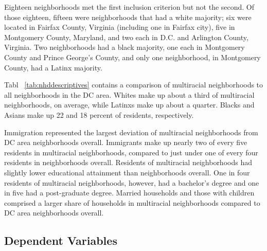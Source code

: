 \documentclass{baderart}
\begin{document}
Eighteen neighborhoods met the first inclusion criterion but not the second. Of those eighteen, fifteen were neighborhoods that had a white majority; six were located in Fairfax County, Virginia (including one in Fairfax city), five in Montgomery County, Maryland, and two each in D.C. and Arlington County, Virginia. Two neighborhoods had a black majority, one each in Montgomery County and Prince George's County, and only one neighborhood, in Montgomery County, had a Latinx majority.

Tabl~ \ref{tab:nhddescriptives} contains a comparison of multiracial neighborhoods to all neighborhoods in the DC area. Whites make up about a third of multiracial neighborhoods, on average, while Latinxs make up about a quarter. Blacks and Asians make up 22 and 18 percent of residents, respectively.


Immigration represented the largest deviation of multiracial neighborhoods from DC area neighborhoods overall. Immigrants make up nearly two of every five residents in multiracial neighborhoods, compared to just under one of every four residents in neighborhoods overall. Residents of multiracial neighborhoods had slightly lower educational attainment than neighborhoods overall. One in four residents of multiracial neighborhoods, however, had a bachelor's degree and one in five had a post-graduate degree. Married households and those with children comprised a larger share of households in multiracial neighborhoods compared to DC area neighborhoods overall.


\subsection{Dependent Variables}\label{dependent-variables}
\end{document}
